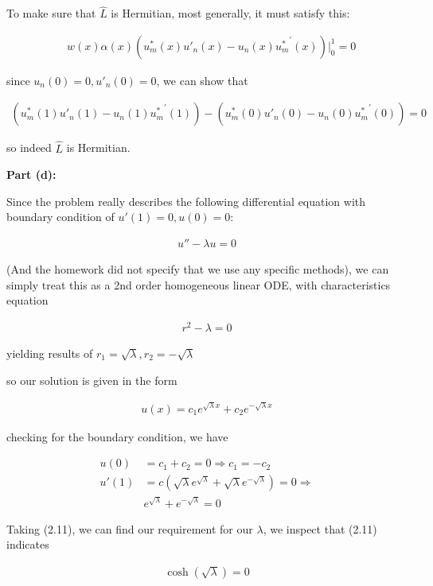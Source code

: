 \documentclass{article}
\numberwithin{equation}{section}
\begin{document}
To make sure that $\hat{L}$ is Hermitian, most generally, it must satisfy this:

\begin{align}
    & w(x) \alpha(x) (u^*_m (x) u'_n(x) - u_n(x) {u^*_m}^{'} (x))  \rvert_{0}^{1} = 0
\end{align}

since $u_n (0) = 0, u'_n(0) = 0$, we can show that

\begin{align}
    ( u^*_m (1) u'_n (1) - u_n (1) {u^*_m}^{'} (1))- ( u^*_m (0) u'_n (0) - u_n (0) {u^*_m}^{'} (0)) = 0
\end{align}

so indeed $\hat{L}$ is Hermitian.

\textbf{Part (d):}

Since the problem really describes the following differential equation with boundary condition of $u'(1) = 0, u(0) = 0$:

\begin{align}
    u'' - \lambda u = 0
\end{align}

(And the homework did not specify that we use any specific methods), we can simply treat this as a 2nd order homogeneous linear ODE, with characteristics equation

\begin{align}
    r^2 - \lambda = 0 
\end{align}

yielding results of $r_1 = \sqrt{\lambda}, r_2 = -\sqrt{\lambda}$

so our solution is given in the form

\begin{align}
    u(x) = c_1 e^{\sqrt{\lambda}x} + c_2 e^{-\sqrt{\lambda}x}
\end{align}

checking for the boundary condition, we have

\begin{align}
    u(0) &= c_1 + c_2 = 0 \Rightarrow c_1 = - c_2 \\
    u'(1) &= c (\sqrt{\lambda}e^{\sqrt{\lambda}} + \sqrt{\lambda}e^{-\sqrt{\lambda}}) = 0 \Rightarrow  \\
    &e^{\sqrt{\lambda}} + e^{-\sqrt{\lambda}} = 0
\end{align}

Taking (2.11), we can find our requirement for our $\lambda$, we inspect that (2.11) indicates

\begin{align}
    \cosh (\sqrt{\lambda}) = 0
\end{align}
\end{document}
